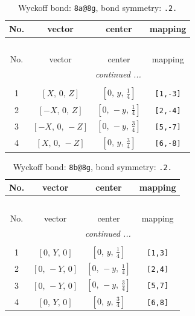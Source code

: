 \documentclass[fleqn,8pt]{jsarticle}
\begin{document}
\begin{longtable}{cccc}
\caption{Wyckoff bond: {\tt 8a@8g}, bond symmetry: {\tt .2.}}
 \\
 \hline \hline
No. & vector & center & mapping \\ \hline \endfirsthead

\multicolumn{3}{l}{\tablename\ \thetable{}} \\
 \hline \hline
No. & vector & center & mapping \\ \hline \endhead

 \hline \hline
\multicolumn{3}{r}{\footnotesize\it continued ...} \\ \endfoot

 \hline \hline
\multicolumn{3}{r}{} \\ \endlastfoot

1 & $\left[ X,\, 0,\, Z \right]$ & $\left[ 0,\, y,\, \frac{1}{4} \right]$ & {\tt [1,-3]} \\ \hline
2 & $\left[ - X,\, 0,\, Z \right]$ & $\left[ 0,\, - y,\, \frac{1}{4} \right]$ & {\tt [2,-4]} \\ \hline
3 & $\left[ - X,\, 0,\, - Z \right]$ & $\left[ 0,\, - y,\, \frac{3}{4} \right]$ & {\tt [5,-7]} \\ \hline
4 & $\left[ X,\, 0,\, - Z \right]$ & $\left[ 0,\, y,\, \frac{3}{4} \right]$ & {\tt [6,-8]} \\
\end{longtable}
\renewcommand{\arraystretch}{1.2}
\begin{longtable}{cccc}
\caption{Wyckoff bond: {\tt 8b@8g}, bond symmetry: {\tt .2.}}
 \\
 \hline \hline
No. & vector & center & mapping \\ \hline \endfirsthead

\multicolumn{3}{l}{\tablename\ \thetable{}} \\
 \hline \hline
No. & vector & center & mapping \\ \hline \endhead

 \hline \hline
\multicolumn{3}{r}{\footnotesize\it continued ...} \\ \endfoot

 \hline \hline
\multicolumn{3}{r}{} \\ \endlastfoot

1 & $\left[ 0,\, Y,\, 0 \right]$ & $\left[ 0,\, y,\, \frac{1}{4} \right]$ & {\tt [1,3]} \\ \hline
2 & $\left[ 0,\, - Y,\, 0 \right]$ & $\left[ 0,\, - y,\, \frac{1}{4} \right]$ & {\tt [2,4]} \\ \hline
3 & $\left[ 0,\, - Y,\, 0 \right]$ & $\left[ 0,\, - y,\, \frac{3}{4} \right]$ & {\tt [5,7]} \\ \hline
4 & $\left[ 0,\, Y,\, 0 \right]$ & $\left[ 0,\, y,\, \frac{3}{4} \right]$ & {\tt [6,8]} \\
\end{longtable}
\end{document}
